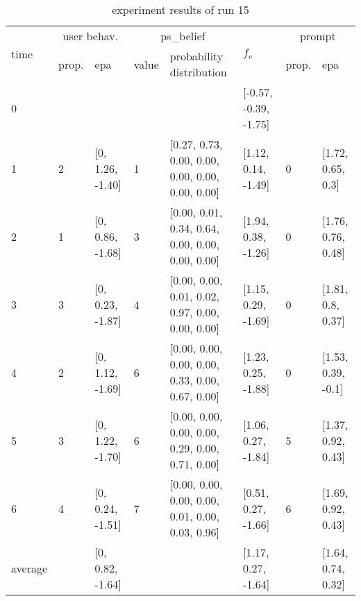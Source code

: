 \begin{table}[htbp]\footnotesize
\caption{experiment results of run 15}
\begin{tabular}{|p{0.4cm}|p{0.6cm}|l|p{0.6cm}|p{3.3cm}|l|p{0.6cm}|l|}
\hline

\multirow{2}{*}{time} & \multicolumn{2}{c|}{user behav.} & \multicolumn{2}{c|}{ps\_belief} &
\multirow{2}{*}{$f_c$} & \multicolumn{2}{c|}{prompt} \\ \cline{2-5}\cline{ 7- 8}
& prop. & epa & value & probability distribution &  & prop. & epa \\ \hline

0 & \multicolumn{1}{l|}{} &  & \multicolumn{1}{l|}{} &  & [-0.57, -0.39, -1.75] & \multicolumn{1}{l|}{} &  \\ \hline
1 & 2 & [0, 1.26, -1.40] & 1 & [0.27, 0.73, 0.00, 0.00, 0.00, 0.00, 0.00, 0.00] & [1.12, 0.14, -1.49] & 0 & [1.72, 0.65, 0.3] \\ \hline
2 & 1 & [0, 0.86, -1.68] & 3 & [0.00, 0.01, 0.34, 0.64, 0.00, 0.00, 0.00, 0.00] & [1.94, 0.38, -1.26] & 0 & [1.76, 0.76, 0.48] \\ \hline
3 & 3 & [0, 0.23, -1.87] & 4 & [0.00, 0.00, 0.01, 0.02, 0.97, 0.00, 0.00, 0.00] & [1.15, 0.29, -1.69] & 0 & [1.81, 0.8, 0.37] \\ \hline
4 & 2 & [0, 1.12, -1.69] & 6 & [0.00, 0.00, 0.00, 0.00, 0.33, 0.00, 0.67, 0.00] & [1.23, 0.25, -1.88] & 0 & [1.53, 0.39, -0.1] \\ \hline
5 & 3 & [0, 1.22, -1.70] & 6 & [0.00, 0.00, 0.00, 0.00, 0.29, 0.00, 0.71, 0.00] & [1.06, 0.27, -1.84] & 5 & [1.37, 0.92, 0.43] \\ \hline
6 & 4 & [0, 0.24, -1.51] & 7 & [0.00, 0.00, 0.00, 0.00, 0.01, 0.00, 0.03, 0.96] & [0.51, 0.27, -1.66] & 6 & [1.69, 0.92, 0.43] \\ \hline
\multicolumn{1}{|l|}{average} & \multicolumn{1}{l|}{} & [0, 0.82, -1.64] & \multicolumn{1}{l|}{} &  & [1.17, 0.27, -1.64] & \multicolumn{1}{l|}{} & [1.64, 0.74, 0.32] \\ \hline
\end{tabular}
\label{}
\end{table}


